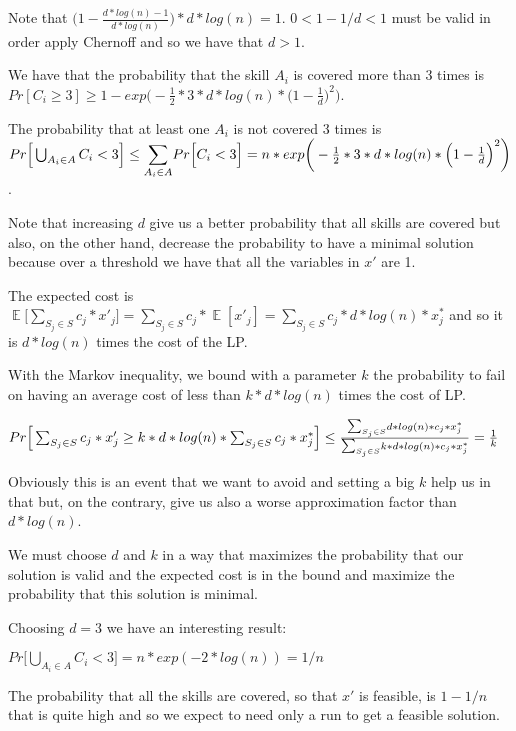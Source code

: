 \documentclass[paper=a4, fontsize=11pt]{scrartcl} %
\numberwithin{equation}{section} %
\numberwithin{figure}{section} %
\numberwithin{table}{section} %
\DeclareMathOperator*{\E}{\mathbb{E}}
\begin{document}
Note that $\Big(1 - \frac{d*log(n) -1}{d*log(n)}\Big)*d*log(n) = 1$. $0 < 1 - 1/d < 1$ must be valid in order apply Chernoff and so we have that $d > 1$.

We have that the probability that the skill $A_i$ is covered more than 3 times is $Pr[C_i \geq 3] \geq 1 - exp\bigg(-\frac{1}{2}*3*d*log(n)*\Big(1 - \frac{1}{d}\Big)^2\bigg)$.


The probability that at least one $A_i$ is not covered 3 times is $Pr\Big[\bigcup_{A_i \in A} C_i < 3\Big] \leq \mathlarger{\sum}_{A_i \in A} Pr\Big[C_i < 3\Big] = n*exp\bigg(-\frac{1}{2}*3*d*log(n)*\Big(1 - \frac{1}{d}\Big)^2\bigg)$.

Note that increasing $d$ give us a better probability that all skills are covered but also, on the other hand, decrease the probability to have a minimal solution because over a threshold we have that all the variables in $x'$ are 1.

The expected cost is $\E\big[\sum_{S_j \in S} c_j*x'_j\big] = \sum_{S_j \in S} c_j*\E[x'_j] = \sum_{S_j \in S} c_j*d*log(n)*x^*_j$ and so it is $d*log(n)$ times the cost of the LP.

With the Markov inequality, we bound with a parameter $k$ the probability to fail on having an average cost of less than $k*d*log(n)$ times the cost of LP.

\bigskip
$Pr\Big[\sum_{S_j \in S} c_j*x'_j \geq k*d*log(n)*\sum_{S_j \in S} c_j*x^*_j\Big] \leq
\frac{\mathlarger{\sum}_{S_j \in S} d*log(n)*c_j*x^*_j}{\mathlarger{\sum}_{S_j \in S} k*d*log(n)*c_j*x^*_j} = \frac{1}{k}$
\bigskip

Obviously this is an event that we want to avoid and setting a big $k$ help us in that but, on the contrary, give us also a worse approximation factor than $d*log(n)$.

We must choose $d$ and $k$ in a way that maximizes the probability that our solution is valid and the expected cost is in the bound and maximize the probability that this solution is minimal.

Choosing $d = 3$ we have an interesting result:

$Pr\Big[\bigcup_{A_i \in A} C_i < 3\Big] = n*exp(-2*log(n)) = 1/n$

The probability that all the skills are covered, so that $x'$ is feasible, is $1 - 1/n$ that is quite high and so we expect to need only a run to get a feasible solution.
\end{document}
